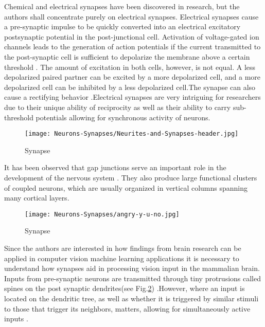 \documentclass{report}
\begin{document}
Chemical and electrical synapses have been discovered in research, but the authors shall concentrate purely on electrical synapses. Electrical synapses cause a pre-synaptic impulse to be quickly converted into an electrical excitatory postsynaptic potential in the post-junctional cell. Activation of voltage-gated ion channels leads to the generation of action potentials if the current transmitted to the post-synaptic cell is sufficient to depolarize the membrane above a certain threshold \cite{Hormuzdi2004}. The amount of excitation in both cells, however, is not equal. A less depolarized paired partner can be excited by a more depolarized cell, and a more depolarized cell can be inhibited by a less depolarized cell.The synapse can also cause a rectifying behavior \cite{Furshpan1959}.Electrical synapses are very intriguing for researchers due to their unique ability of reciprocity as well as their ability to carry sub-threshold potentials allowing for synchronous activity of neurons.

\begin{figure}[htp]
    \centering
    \texttt{[image: Neurons-Synapses/Neurites-and-Synapses-header.jpg]}
    \caption{Synapse}
    \label{fig:synapse}
\end{figure}

It has been observed that gap junctions serve an important role in the development of the nervous system \cite{Fischbach1972}. They also produce large functional clusters of coupled neurons, which are usually organized in vertical columns spanning many cortical layers\cite{Peinado1993}\cite{Yuste1992}.

\begin{figure}[htp]
    \centering
    \texttt{[image: Neurons-Synapses/angry-y-u-no.jpg]}
    \caption{Synapse}
    \label{fig:spines}
\end{figure}
Since the authors are interested in how findings from brain research can be applied in computer vision machine learning applications it is necessary to understand how synapses aid in processing vision input in the mammalian brain. Inputs from pre-synaptic neurons are transmitted through tiny protrusions called spines on the post synaptic dendrites(see Fig.\ref{fig:spines}) \cite{tobias2017}.However, where an input is located on the dendritic tree, as well as whether it is triggered by similar stimuli to those that trigger its neighbors, matters, allowing for simultaneously active inputs \cite{London2005}.
\end{document}
